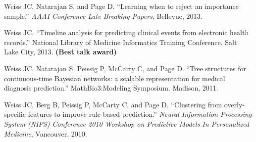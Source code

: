 \begin{bibsection}
\item  Weiss JC, Natarajan S, and Page D. ``Learning when to reject an importance sample.'' \textit{AAAI Conference Late Breaking Papers}, Bellevue, 2013.

\item  Weiss JC. ``Timeline analysis for predicting clinical events from electronic health records.'' National Library of Medicine Informatics Training Conference. Salt Lake City, 2013. \textbf{(Best talk award)}

\item  Weiss JC, Natarajan S, Peissig P, McCarty C, and Page D. ``Tree structures for continuous-time Bayesian networks: a scalable representation for medical diagnosis prediction.'' MathBio3:Modeling Symposium. Madison, 2011.

\item  Weiss JC, Berg B, Peissig P, McCarty C, and Page D. ``Clustering from overly-specific features to improve rule-based prediction.'' \textit{Neural Information Processing System (NIPS) Conference 2010 Workshop on Predictive Models In Personalized Medicine}, Vancouver, 2010.
 
\end{bibsection}


